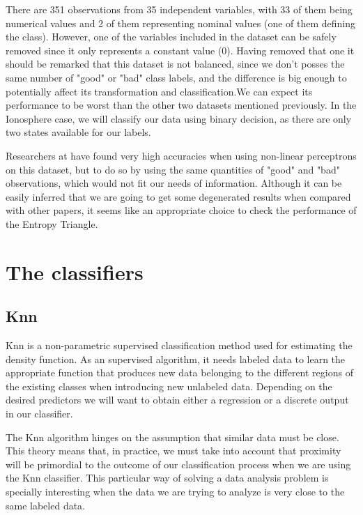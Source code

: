There are 351 observations from 35 independent variables, with 33 of them being numerical values and 2 of them representing nominal values (one of them defining the class). However, one of the variables included in the dataset can be safely removed since it only represents a constant value (0). Having removed that one it should be remarked that this dataset is not balanced, since we don't posses the same number of "good" or "bad" class labels, and the difference is big enough to potentially affect its transformation and classification.We can expect its performance to be worst than the other two datasets mentioned previously. In the Ionosphere case, we will classify our data using binary decision, as there are only two states available for our labels. \par

Researchers at \cite{Sigillito1989ClassificationOR} have found very high accuracies when using non-linear perceptrons on this dataset, but to do so by using the same quantities of "good" and "bad" observations, which would not fit our needs of information. Although it can be easily inferred that we are going to get some degenerated results when compared with other papers, it seems like an appropriate choice to check the performance of the Entropy Triangle. \par 

\section{The classifiers}
\subsection{Knn}

Knn is a non-parametric supervised classification method used for estimating the density function. As an supervised algorithm, it needs labeled data to learn the appropriate function that produces new data belonging to the different regions of the existing classes when introducing new unlabeled data. Depending on the desired predictors we will want to obtain either a regression or a discrete output in our classifier. \par

The Knn algorithm hinges on the assumption that similar data must be close. This theory means that, in practice, we must take into account that proximity will be primordial to the outcome of our classification process when we are using the Knn classifier. This particular way of solving a data analysis problem is specially interesting when the data we are trying to analyze is very close to the same labeled data. \par


